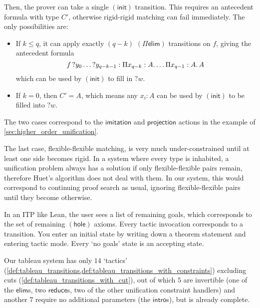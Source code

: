 \documentclass[twoside]{report}
\begin{document}
\begin{example}
Then, the prover can take a single $(\mathsf{init})$ transition. This requires an antecedent formula with type $C'$, otherwise rigid-rigid matching can fail immediately. The only possibilities are:
\begin{itemize}
    \item If $k \leq q$, it can apply exactly $(q - k)$ $(\Pi\mathsf{elim})$ transitions on $f$, giving the antecedent formula
    $$
    {{{f}\,{?y_0}}\,{\ldots}}\,{?y_{q-k-1}} : \Pi{x_{q-k}} : {A}.\,{\ldots \Pi{x_{q-1}} : {A}.\,{A}}
    $$
    which can be used by $(\mathsf{init})$ to fill in ${?w}$.

    \item If $k = 0$, then $C' = A$, which means any $x_i : A$ can be used by $(\mathsf{init})$ to be filled into ${?w}$.
\end{itemize}
The two cases correspond to the $\mathsf{imitation}$ and $\mathsf{projection}$ actions in the example of \cref{sec:higher_order_unification}.
\end{example}

The last case, flexible-flexible matching, is very much under-constrained until at least one side becomes rigid. In a system where every type is inhabited, a unification problem always has a solution if only flexible-flexible pairs remain, therefore Huet's algorithm does not deal with them. In our system, this would correspond to continuing proof search as usual, ignoring flexible-flexible pairs until they become otherwise.


In an ITP like Lean, the user sees a list of remaining goals, which corresponds to the set of remaining $(\mathsf{hole})$ axioms. Every tactic invocation corresponds to a transition. You enter an initial state by writing down a theorem statement and entering tactic mode. Every `no goals' state is an accepting state.

Our tableau system has only $14$ `tactics' (\cref{def:tableau_transitions,def:tableau_transitions_with_constraints}) excluding cuts (\cref{def:tableau_transitions_with_cut}), out of which $5$ are invertible (one of the $\mathsf{elim}$s, two $\mathsf{reduce}$s, two of the other unification constraint handlers) and another $7$ require no additional parameters (the $\mathsf{intro}$s), but is already complete.
\end{document}
